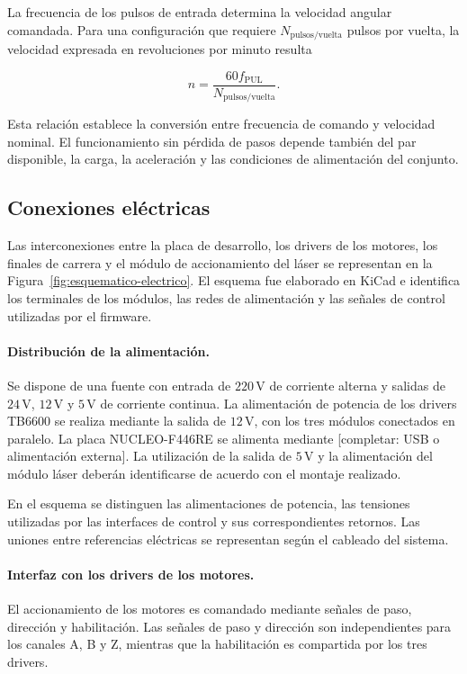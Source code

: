 \documentclass[blue,fullpaper]{ludusofficial}  %
\begin{document}
La frecuencia de los pulsos de entrada determina
la velocidad angular comandada. Para una configuración
que requiere $N_{\mathrm{pulsos/vuelta}}$ pulsos
por vuelta, la velocidad expresada en revoluciones
por minuto resulta

\begin{equation}
    n = \frac{60 f_{\mathrm{PUL}}}
    {N_{\mathrm{pulsos/vuelta}}}.
\end{equation}

Esta relación establece la conversión entre
frecuencia de comando y velocidad nominal.
El funcionamiento sin pérdida de pasos depende
también del par disponible, la carga, la aceleración
y las condiciones de alimentación del conjunto.

\subsection{Conexiones eléctricas}

Las interconexiones entre la placa de desarrollo,
los drivers de los motores, los finales de carrera
y el módulo de accionamiento del láser se representan
en la Figura~\ref{fig:esquematico-electrico}.
El esquema fue elaborado en KiCad e identifica
los terminales de los módulos, las redes de alimentación
y las señales de control utilizadas por el firmware.

\paragraph{Distribución de la alimentación.}
Se dispone de una fuente con entrada de
$220\,\mathrm{V}$ de corriente alterna y salidas de
$24\,\mathrm{V}$, $12\,\mathrm{V}$ y $5\,\mathrm{V}$ de corriente continua.
La alimentación de potencia de los drivers TB6600
se realiza mediante la salida de $12\,\mathrm{V}$,
con los tres módulos conectados en paralelo.
La placa NUCLEO-F446RE se alimenta mediante
[completar: USB o alimentación externa].
La utilización de la salida de $5\,\mathrm{V}$ y
la alimentación del módulo láser deberán identificarse
de acuerdo con el montaje realizado.

En el esquema se distinguen las alimentaciones
de potencia, las tensiones utilizadas por las
interfaces de control y sus correspondientes retornos.
Las uniones entre referencias eléctricas se representan
según el cableado del sistema.

\paragraph{Interfaz con los drivers de los motores.}
El accionamiento de los motores es comandado mediante
señales de paso, dirección y habilitación.
Las señales de paso y dirección son independientes
para los canales A, B y Z, mientras que la habilitación
es compartida por los tres drivers.
\end{document}
